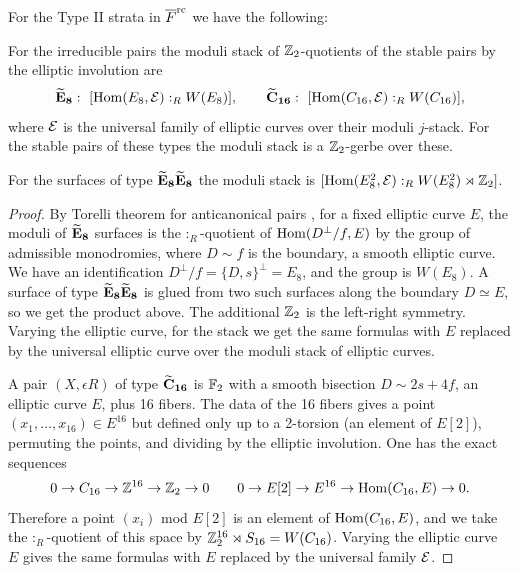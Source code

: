 \documentclass[table,x11names]{amsart}
\begin{document}
 For the Type II strata in ${\overline F}^{{\rm rc}}$ we have the following:


\begin{theorem}\label{thm:moduli-slc-pair-type2}
  For the irreducible pairs the 
  moduli stack of ${\mathbb Z}_2$-quotients of the stable pairs by the
  elliptic involution are
  \begin{displaymath}
    {\bf {\widetilde E}_8}: \  [\operatorname{Hom}(E_8, {\mathcal E}) :_R W(E_8)], 
    \qquad
   {\bf {\widetilde C}_{16}}: \ [\operatorname{Hom}(C_{16},{\mathcal E}) :_R W(C_{16})],
  \end{displaymath}
  where ${\mathcal E}$ is the universal family of elliptic curves over their moduli
  $j$-stack. For the stable pairs of these types the moduli stack is a
  ${\mathbb Z}_2$-gerbe over these.

  For the surfaces of type ${\bf {\widetilde E}_8{\widetilde E}_8}$ the moduli stack 
  is $[\operatorname{Hom}(E_8^2, {\mathcal E}) :_R W(E_8^2)\rtimes{\mathbb Z}_2]$.
\end{theorem}
\begin{proof}
  By Torelli theorem for anticanonical pairs
  \cite{gross2015moduli-of-surfaces, friedman2015on-the-geometry}, for a
  fixed elliptic curve $E$, the moduli of ${\bf {\widetilde E}_8}$ surfaces is the $:_R$-quotient of
  $\operatorname{Hom}(D^\perp / f, E)$ by the group of admissible monodromies, where $D\sim f$
  is the boundary, a smooth elliptic curve. We have an identification
  $D^\perp/f = \{D, s\}^\perp = E_8$, and the group is
  $W(E_8)$. A surface of type ${\bf {\widetilde E}_8{\widetilde E}_8}$ is glued from two such
  surfaces along the boundary $D\simeq E$, so we get the product
  above. The additional ${\mathbb Z}_2$ is the left-right symmetry. Varying
  the elliptic curve, for the stack we get the same formulas with $E$
  replaced by the universal elliptic curve over the moduli stack of elliptic curves.

  A pair $(X,\epsilon R)$ of type ${\bf {\widetilde C}_{16}}$ is ${\mathbb F}_2$ with a
  smooth bisection $D\sim 2s+4f$, an elliptic curve $E$, plus 16
  fibers. The data of the 16 fibers gives a point $(x_1,\dotsc,
  x_{16}) \in E^{16}$ but defined only up to a 2-torsion (an element
  of $E[2]$), permuting the points, and dividing by the elliptic
  involution. One has the exact sequences
  \begin{displaymath}
    0 \to C_{16} \to {\mathbb Z}^{16}\to {\mathbb Z}_2\to 0 
    \qquad
    0 \to E[2] \to E^{16} \to \operatorname{Hom}(C_{16}, E) \to 0.
  \end{displaymath}
  Therefore a point $(x_i)$ mod $E[2]$ is an element of $\operatorname{Hom}(C_{16},
  E)$, and we take the $:_R$-quotient of this space by ${\mathbb Z}_2^{16}\rtimes S_{16} =
  W(C_{16})$. Varying the elliptic curve $E$ gives the same
  formulas with $E$ replaced by the universal family ${\mathcal E}$.
\end{proof}
\end{document}
